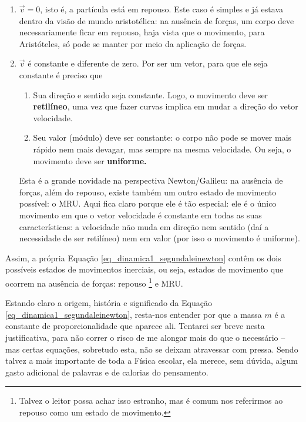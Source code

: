 \begin{enumerate}
    \item [(i)] $\vec v = 0$, isto é, a partícula está em repouso. Este caso é simples e já estava dentro da visão de mundo aristotélica: na ausência de forças, um corpo deve necessariamente ficar em repouso, haja vista que o movimento, para Aristóteles, só pode se manter por meio da aplicação de forças.

    \item[(ii)] $\vec v$ é constante e diferente de zero. Por ser um vetor, para que ele seja constante é preciso que
       \begin{enumerate}
           \item Sua direção e sentido seja constante. Logo, o movimento deve ser \textbf{retilíneo}, uma vez que fazer curvas implica em mudar a direção do vetor velocidade.

           \item Seu valor (módulo) deve ser constante: o corpo não pode se mover mais rápido nem mais devagar, mas sempre na mesma velocidade. Ou seja, o movimento deve ser \textbf{uniforme.}
       \end{enumerate}

       Esta é a grande novidade na perspectiva Newton/Galileu: na ausência de forças, além do repouso, existe também um outro estado de movimento possível: o MRU. Aqui fica claro porque ele é tão especial: ele é o único movimento em que o vetor velocidade é constante em todas as suas características: a velocidade não muda em direção nem sentido (daí a necessidade de ser retilíneo) nem em valor (por isso o movimento é uniforme).
\end{enumerate}

Assim, a própria Equação \eqref{eq_dinamica1_segundaleinewton} contêm os dois possíveis estados de movimentos inerciais, ou seja, estados de movimento que ocorrem na ausência de forças: repouso \footnote{Talvez o leitor possa achar isso estranho, mas é comum nos referirmos ao repouso como um estado de movimento.} e MRU.


Estando claro a origem, história e significado da Equação  \eqref{eq_dinamica1_segundaleinewton}, resta-nos entender por que a massa $m$ é a constante de proporcionalidade que aparece ali. Tentarei ser breve nesta justificativa, para não correr o risco de me alongar mais do que o necessário -- mas certas equações, sobretudo esta, não se deixam atravessar com pressa. Sendo talvez a mais importante de toda a Física escolar, ela merece, sem dúvida, algum gasto adicional de palavras e de calorias do pensamento.

